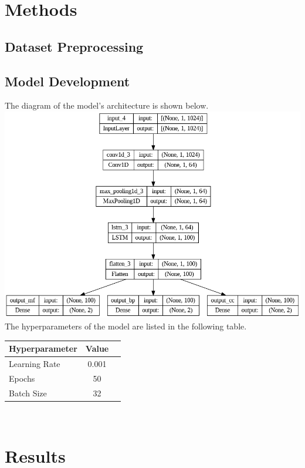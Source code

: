 \documentclass[10pt,twocolumn,letterpaper]{article}
\begin{document}
\section{Methods}

\subsection{Dataset Preprocessing}

\subsection{Model Development}

The diagram of the model's architecture is shown below. \\

\includegraphics[scale=0.25]{img/model_diagram.png} \\

The hyperparameters of the model are listed in the following table. \\

\begin{tabular}{lcc}
    \toprule
    Hyperparameter & Value \\
    \midrule
    Learning Rate & 0.001 \\
    Epochs & 50 \\
    Batch Size & 32 \\
    \bottomrule
\end{tabular} \\


\section{Results}
\end{document}
